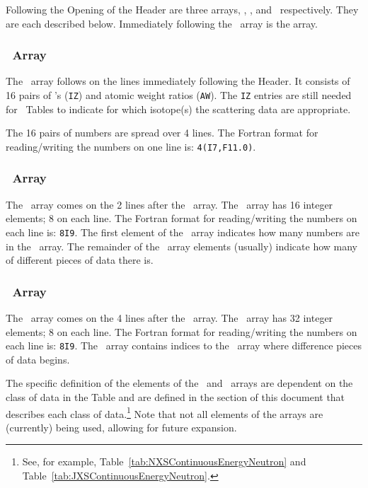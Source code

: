 Following the Opening of the Header are three arrays, \IZAW, \NXS, and \JXS\ respectively. They are each described below. Immediately following the \JXS\ array is the \XSS array.

\subsubsection{\IZAW\ Array}
The \IZAW\ array follows on the lines immediately following the Header. It consists of \num{16} pairs of \ZA's (\texttt{IZ}) and atomic weight ratios (\texttt{AW}). The \texttt{IZ} entries are still needed for \SaB\ Tables to indicate for which isotope(s) the scattering data are appropriate.

The \num{16} pairs of numbers are spread over \num{4} lines. The Fortran format for reading/writing the numbers on one line is: \texttt{4(I7,F11.0)}.

\subsubsection{\NXS\ Array}
The \NXS\ array comes on the \num{2} lines after the \IZAW\ array. The \NXS\ array has \num{16} integer elements; \num{8} on each line. The Fortran format for reading/writing the numbers on each line is: \texttt{8I9}. The first element of the \NXS\ array indicates how many numbers are in the \XSS\ array. The remainder of the \NXS\ array elements (usually) indicate how many of different pieces of data there is. 

\subsubsection{\JXS\ Array}
The \JXS\ array comes on the \num{4} lines after the \NXS\ array. The \JXS\ array has \num{32} integer elements; \num{8} on each line. The Fortran format for reading/writing the numbers on each line is: \texttt{8I9}. The \JXS\ array contains indices to the \XSS\ array where difference pieces of data begins. 

The specific definition of the elements of the \NXS\ and \JXS\ arrays are dependent on the class of data in the Table and are defined in the section of this document that describes each class of data.\footnote{See, for example, Table~\ref{tab:NXSContinuousEnergyNeutron} and Table~\ref{tab:JXSContinuousEnergyNeutron}.} Note that not all elements of the arrays are (currently) being used, allowing for future expansion.


